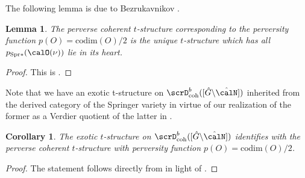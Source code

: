 \documentclass[10pt, reqno]{amsart}
\theoremstyle{plain}
\newtheorem{lemma}[theorem]{Lemma}
\newtheorem{corollary}[theorem]{Corollary}
\theoremstyle{definition}
\numberwithin{equation}{section}
\begin{document}
The following lemma is due to Bezrukavnikov \cite{Bez03}.
\begin{lemma}\label{lemma_perverse_coh_t_strucutre}
	The perverse coherent $t$-structure corresponding to the perversity function $p(O)=\mathrm{codim} (O)/2$ is the unique $t$-structure which has all $p_{\mathrm{Spr}*}(\calO(\nu))$ lie in its heart.
\end{lemma}
\begin{proof}
	This is \cite[Corollary 3]{Bez03}.
\end{proof}
Note that we have an exotic t-structure on $\scrD^b_\mathrm{coh}([\hat{G}\backslash \hat{\calN}])$ inherited from the derived category of the Springer variety in virtue of our realization of the former as a Verdier quotient of the latter in .

\begin{corollary}\label{thm_perverse_coh_compare_with_exotic_perverse}
	The exotic $t$-structure on $\scrD^b_\mathrm{coh}([\hat{G}\backslash \hat{\calN}])$ identifies with the perverse coherent $t$-structure with perversity function $p(O)=\mathrm{codim} (O)/2$.
\end{corollary}
\begin{proof}
	The statement follows directly from  in light of .
\end{proof}
\end{document}
